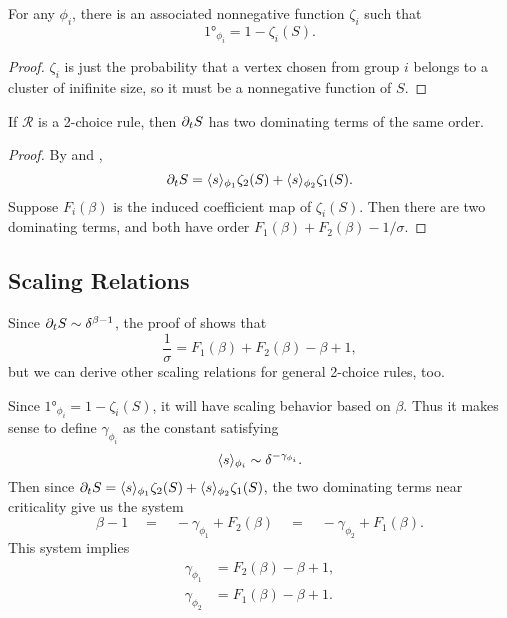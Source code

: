 \documentclass[twoside,10pt]{article}
\begin{document}
\begin{lem}[]
	\label{zeta}
For any $\phi_i$, there is an associated nonnegative function $\zeta_i$ such that
\[
	\ang{1}_{\phi_i} = 1 - \zeta_i(S).
\]
\end{lem}
\begin{proof}
	$\zeta_i$ is just the probability that a vertex chosen from group $i$ belongs to a cluster of inifinite size, so it must be a nonnegative function of $S$.
\end{proof}

\begin{thrm}
	\label{2-dom-terms}
If $\mathcal{R}$ is a 2-choice rule, then $\partial_{t}{S} $ has two dominating terms of the same order.
\end{thrm}
\begin{proof}
	By  and ,
        \[
	\partial_{t}{S} = \langle s \rangle_{\phi_1}\zeta_{2}(S) + \langle s \rangle_{\phi_2} \zeta_{1}(S).
	\]
	Suppose $F_i(\beta)$ is the induced coefficient map of $\zeta_i(S)$. Then there are two dominating terms, and both have order $F_1(\beta) + F_2(\beta) - 1/\sigma$.
\end{proof}

\subsection{Scaling Relations}

Since $\partial_{t}{S} \sim \delta^{\beta-1}$, the proof of  shows that
\begin{equation}
	\frac{1}{\sigma} = F_1(\beta) + F_2(\beta) - \beta + 1,
\end{equation}
but we can derive other scaling relations for general 2-choice rules, too.

Since $\ang{1}_{\phi_i} = 1 - \zeta_i(S)$, it will have scaling behavior based on $\beta$. Thus it makes sense to define $\gamma_{\phi_i}$ as the constant satisfying
\[
\langle s \rangle_{\phi_i} \sim \delta^{-\gamma_{\phi_i}}.
\]
Then since $\partial_{t}{S} = \langle s \rangle_{\phi_1}\zeta_2(S) + \langle s \rangle_{\phi_2}\zeta_1(S)$, the two dominating terms near criticality give us the system
\[
	\beta -1 \quad=\quad -\gamma_{\phi_1} + F_2(\beta) \quad=\quad -\gamma_{\phi_2} + F_1(\beta).
\]
This system implies
\begin{align}
	\gamma_{\phi_1} &= F_2(\beta) - \beta + 1,\\
	\gamma_{\phi_2} &= F_1(\beta) - \beta + 1.
\end{align}
\end{document}
